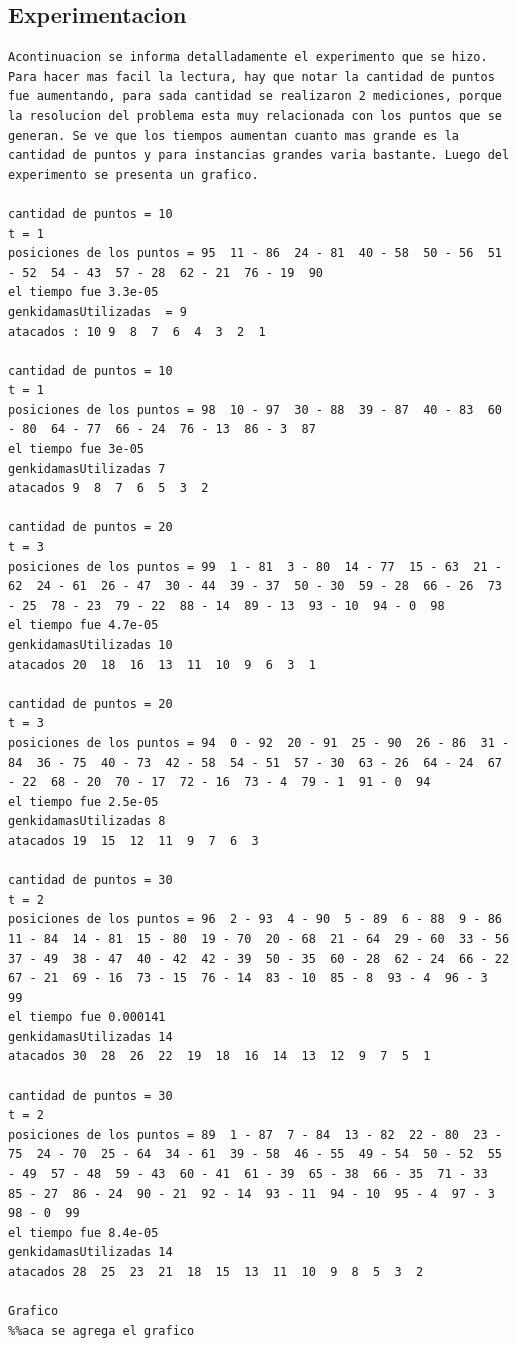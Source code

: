 \documentclass[10pt,a4paper]{article}
\begin{document}
\subsection{Experimentacion}
\begin{verbatim}
Acontinuacion se informa detalladamente el experimento que se hizo. Para hacer mas facil la lectura, hay que notar la cantidad de puntos fue aumentando, para sada cantidad se realizaron 2 mediciones, porque la resolucion del problema esta muy relacionada con los puntos que se generan. Se ve que los tiempos aumentan cuanto mas grande es la cantidad de puntos y para instancias grandes varia bastante. Luego del experimento se presenta un grafico.

cantidad de puntos = 10
t = 1
posiciones de los puntos = 95  11 - 86  24 - 81  40 - 58  50 - 56  51 - 52  54 - 43  57 - 28  62 - 21  76 - 19  90
el tiempo fue 3.3e-05
genkidamasUtilizadas  = 9
atacados : 10 9  8  7  6  4  3  2  1

cantidad de puntos = 10
t = 1
posiciones de los puntos = 98  10 - 97  30 - 88  39 - 87  40 - 83  60 - 80  64 - 77  66 - 24  76 - 13  86 - 3  87
el tiempo fue 3e-05
genkidamasUtilizadas 7
atacados 9  8  7  6  5  3  2

cantidad de puntos = 20
t = 3
posiciones de los puntos = 99  1 - 81  3 - 80  14 - 77  15 - 63  21 - 62  24 - 61  26 - 47  30 - 44  39 - 37  50 - 30  59 - 28  66 - 26  73 - 25  78 - 23  79 - 22  88 - 14  89 - 13  93 - 10  94 - 0  98
el tiempo fue 4.7e-05
genkidamasUtilizadas 10
atacados 20  18  16  13  11  10  9  6  3  1

cantidad de puntos = 20
t = 3
posiciones de los puntos = 94  0 - 92  20 - 91  25 - 90  26 - 86  31 - 84  36 - 75  40 - 73  42 - 58  54 - 51  57 - 30  63 - 26  64 - 24  67 - 22  68 - 20  70 - 17  72 - 16  73 - 4  79 - 1  91 - 0  94
el tiempo fue 2.5e-05
genkidamasUtilizadas 8
atacados 19  15  12  11  9  7  6  3

cantidad de puntos = 30
t = 2
posiciones de los puntos = 96  2 - 93  4 - 90  5 - 89  6 - 88  9 - 86  11 - 84  14 - 81  15 - 80  19 - 70  20 - 68  21 - 64  29 - 60  33 - 56  37 - 49  38 - 47  40 - 42  42 - 39  50 - 35  60 - 28  62 - 24  66 - 22  67 - 21  69 - 16  73 - 15  76 - 14  83 - 10  85 - 8  93 - 4  96 - 3  99
el tiempo fue 0.000141
genkidamasUtilizadas 14
atacados 30  28  26  22  19  18  16  14  13  12  9  7  5  1

cantidad de puntos = 30
t = 2
posiciones de los puntos = 89  1 - 87  7 - 84  13 - 82  22 - 80  23 - 75  24 - 70  25 - 64  34 - 61  39 - 58  46 - 55  49 - 54  50 - 52  55 - 49  57 - 48  59 - 43  60 - 41  61 - 39  65 - 38  66 - 35  71 - 33  85 - 27  86 - 24  90 - 21  92 - 14  93 - 11  94 - 10  95 - 4  97 - 3  98 - 0  99
el tiempo fue 8.4e-05
genkidamasUtilizadas 14
atacados 28  25  23  21  18  15  13  11  10  9  8  5  3  2

Grafico
%%aca se agrega el grafico
\end{verbatim}
\end{document}
